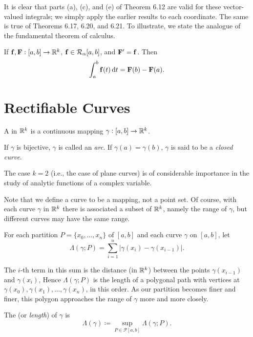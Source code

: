 It is clear that parts (a), (c), and (e) of Theorem 6.12 are valid for these
vector-valued integrals; we simply apply the earlier results to each coordinate.
The same is true of Theorems 6.17, 6.20, and 6.21. To illustrate, we state the analogue of the fundamental theorem of calculus.

\begin{proposition}
If $\vb{f},\vb{F}:[a,b]\to\mathbb R^k$, $\vb{f}\in\mathcal{R}_\alpha[a,b]$, and $\vb{F}^\prime=\vb{f}$. Then
\begin{equation}
\int_{a}^{b}\vb{f}(t)\dd{t}=\vb{F}(b)-\vb{F}(a).
\end{equation}
\end{proposition}
\pagebreak

\section{Rectifiable Curves}
\begin{definition}[Curve]
A  in $\mathbb R^k$ is a continuous mapping $\gamma:[a,b]\to\mathbb R^k$.

If $\gamma$ is bijective, $\gamma$ is called an \emph{arc}. If $\gamma(a)=\gamma(b)$, $\gamma$ is said to be a \emph{closed curve}.
\end{definition}

The case $k=2$ (i.e., the case of plane curves) is of considerable importance in the study of analytic functions of a complex variable.

\begin{remark}
Note that we define a curve to be a mapping, not a point set. Of course, with each curve $\gamma$ in $\mathbb R^k$ there is associated a subset of $\mathbb R^k$, namely the range of $\gamma$, but different curves may have the same range. 
\end{remark}

For each partition $P=\{x_0,\dots,x_n\}$ of $[a,b]$ and each curve $\gamma$ on $[a,b]$, let
\[\Lambda(\gamma;P)=\sum_{i=1}^{n}|\gamma(x_i)-\gamma(x_{i-1})|.\]

The $i$-th term in this sum is the distance (in $\mathbb R^k$) between the points $\gamma(x_{i-1})$ and $\gamma(x_i)$, Hence $\Lambda(\gamma;P)$ is the length of a polygonal path with vertices at $\gamma(x_0),\gamma(x_1),\dots,\gamma(x_n)$, in this order. As our partition becomes finer and finer, this polygon approaches the range of $\gamma$ more and more closely.

\begin{definition}
The  (or \emph{length}) of $\gamma$ is
\[\Lambda(\gamma)\coloneqq\sup_{P\in\mathcal{P}[a,b]}\Lambda(\gamma;P).\]
\end{definition}

